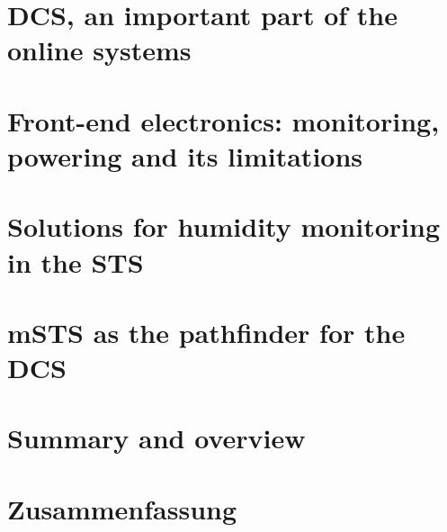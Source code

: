 \chapter{DCS, an important part of the online systems}
\label{chap:online_systems}






\chapter{Front-end electronics: monitoring, powering and its limitations}
\label{chap:containers}



\chapter{Solutions for humidity monitoring in the STS}
\label{chap:fos}



\chapter{mSTS as the pathfinder for the DCS}
\label{chap:msts}
        

\chapter{Summary and overview}
\label{chap:last}


%
%
%
\chapter*{Zusammenfassung}

%

\renewcommand\listfigurename{List of Figures}
\listoffigures
{}
\renewcommand\listtablename{List of Tables}
\listoftables

{}
\printbibliography
\printglossaries



